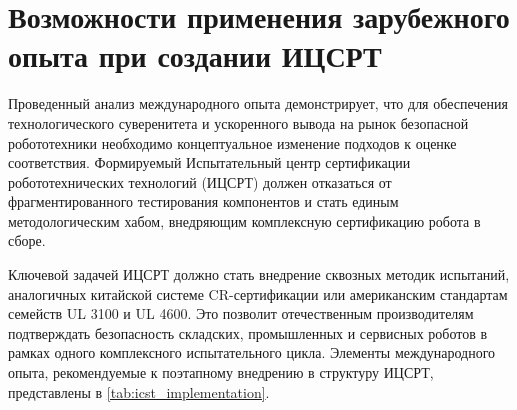 \newpage
\section{Возможности применения зарубежного опыта при создании ИЦСРТ}

Проведенный анализ международного опыта демонстрирует, что для обеспечения технологического суверенитета и ускоренного вывода на рынок безопасной робототехники необходимо концептуальное изменение подходов к оценке соответствия. Формируемый Испытательный центр сертификации робототехнических технологий (ИЦСРТ) должен отказаться от фрагментированного тестирования компонентов и стать единым методологическим хабом, внедряющим комплексную сертификацию робота в сборе.

Ключевой задачей ИЦСРТ должно стать внедрение сквозных методик испытаний, аналогичных китайской системе CR-сертификации или американским стандартам семейств UL 3100 и UL 4600. Это позволит отечественным производителям подтверждать безопасность складских, промышленных и сервисных роботов в рамках одного комплексного испытательного цикла. Элементы международного опыта, рекомендуемые к поэтапному внедрению в структуру ИЦСРТ, представлены в \cref{tab:icst_implementation}.

